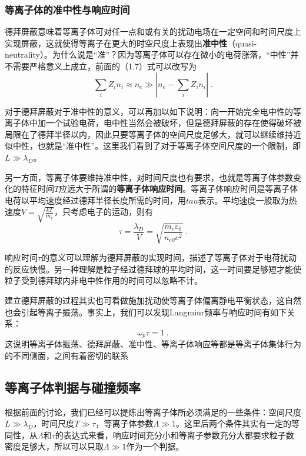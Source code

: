 			\subsubsection{等离子体的准中性与响应时间}
			\hspace{2em}德拜屏蔽意味着等离子体可对任一点和或有关的扰动电场在一定空间和时间尺度上实现屏蔽，这就使得等离子在更大的时空尺度上表现出\textbf{准中性}（quasi-neutrality）。为什么说是“准”？因为等离子体可以存在微小的电荷涨落，“中性”并不需要严格意义上成立，前面的（1.7）式可以改写为
			\begin{equation} 
			\sum_i Z_in_{i}\approx n_e\gg \left|n_e-\sum_i Z_in_{i}\right|~.
			\end{equation}
			
			对于德拜屏蔽对于准中性的意义，可以再加以如下说明：向一开始完全电中性的等离子体中加一个试验电荷，电中性当然会被破坏，但是德拜屏蔽的存在使得破坏被局限在了德拜半径以内，因此只要等离子体的空间尺度足够大，就可以继续维持近似中性，也就是“准中性”。这里我们看到了对于等离子体空间尺度的一个限制，即$L\gg \lambda_D$。
			
			另一方面，等离子体要维持准中性，对时间尺度也有要求，也就是等离子体参数变化的特征时间$T$应远大于所谓的\textbf{等离子体响应时间}。等离子体响应时间是等离子体电荷以平均速度经过德拜半径长度所需的时间，用$tau$表示。平均速度一般取为热速度$V=\sqrt{\frac{kT}{m_e}}$，只考虑电子的运动，则有
			\begin{equation} 
			\tau=\frac{\lambda_D}{V}=\sqrt{\frac{m_e\varepsilon_0}{n_{e0}e^2}}~.
			\end{equation}
			
			响应时间$\tau$的意义可以理解为德拜屏蔽的实现时间，描述了等离子体对于电荷扰动的反应快慢。另一种理解是粒子经过德拜球的平均时间，这一时间要足够短才能使粒子受到德拜球内非电中性作用的时间可以忽略不计。
			
			建立德拜屏蔽的过程其实也可看做施加扰动使等离子体偏离静电平衡状态，这自然也会引起等离子振荡。事实上，我们可以发现Langmiur频率与响应时间有如下关系：
			\begin{equation} 
			\omega_p \tau=1~.
			\end{equation}
			这说明等离子体振荡、德拜屏蔽、准中性、等离子体响应等都是等离子体集体行为的不同侧面，之间有着密切的联系
			
		\subsection{等离子体判据与碰撞频率}
		\hspace{2em}根据前面的讨论，我们已经可以提炼出等离子体所必须满足的一些条件：空间尺度$L\gg \lambda_D$，时间尺度$T\gg\tau$，等离子体参数$\varLambda\gg1$。这里后两个条件其实有一定的等同性，从$\varLambda$和$\tau$的表达式来看，响应时间充分小和等离子参数充分大都要求粒子数密度足够大，所以可以只取$\varLambda\gg1$作为一个判据。
		
